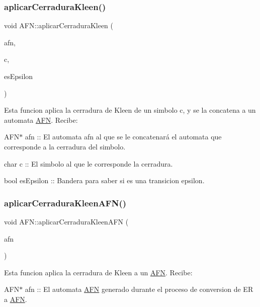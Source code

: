 \subsubsection{\texorpdfstring{aplicar\+Cerradura\+Kleen()}{aplicarCerraduraKleen()}}
{\footnotesize\ttfamily void A\+F\+N\+::aplicar\+Cerradura\+Kleen (\begin{DoxyParamCaption}\item[{\hyperlink{class_a_f_n}{A\+FN} $\ast$}]{afn,  }\item[{char}]{c,  }\item[{bool}]{es\+Epsilon }\end{DoxyParamCaption})}

Esta funcion aplica la cerradura de Kleen de un simbolo c, y se la concatena a un automata \hyperlink{class_a_f_n}{A\+FN}. Recibe\+:
\begin{DoxyItemize}
\item A\+F\+N$\ast$ afn \+:\+: El automata afn al que se le concatenará el automata que corresponde a la cerradura del simbolo.
\item char c \+:\+: El simbolo al que le corresponde la cerradura.
\item bool es\+Epsilon \+:\+: Bandera para saber si es una transicion epsilon. 
\end{DoxyItemize}\mbox{\label{class_a_f_n_a778ea064155d383463cabd37ac301a14}} 
\subsubsection{\texorpdfstring{aplicar\+Cerradura\+Kleen\+A\+F\+N()}{aplicarCerraduraKleenAFN()}}
{\footnotesize\ttfamily void A\+F\+N\+::aplicar\+Cerradura\+Kleen\+A\+FN (\begin{DoxyParamCaption}\item[{\hyperlink{class_a_f_n}{A\+FN} $\ast$}]{afn }\end{DoxyParamCaption})}

Esta funcion aplica la cerradura de Kleen a un \hyperlink{class_a_f_n}{A\+FN}. Recibe\+:
\begin{DoxyItemize}
\item A\+F\+N$\ast$ afn \+:\+: El automata \hyperlink{class_a_f_n}{A\+FN} generado durante el proceso de conversion de ER a \hyperlink{class_a_f_n}{A\+FN}. 
\end{DoxyItemize}\mbox{\label{class_a_f_n_a7341086a00410a1a6a2ba4262a10d249}} 
